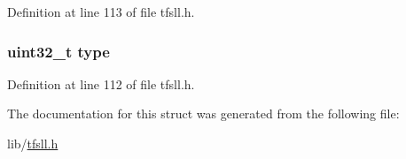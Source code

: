 Definition at line 113 of file tfsll.\+h.

\hypertarget{structf__stat_ad44b615021ed3ccb734fcaf583ef4a03}{}
\subsubsection[{type}]{\setlength{\rightskip}{0pt plus 5cm}uint32\+\_\+t type}\label{structf__stat_ad44b615021ed3ccb734fcaf583ef4a03}


Definition at line 112 of file tfsll.\+h.



The documentation for this struct was generated from the following file\+:\begin{DoxyCompactItemize}
\item 
lib/\hyperlink{tfsll_8h}{tfsll.\+h}\end{DoxyCompactItemize}
